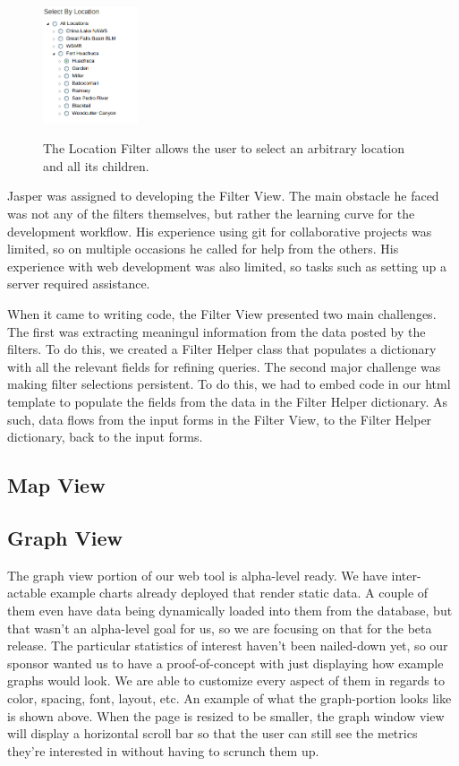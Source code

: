 \documentclass[10pt,peerreview,onecolumn,draftclsnofoot,technote]{IEEEtran}
\begin{document}
\begin{figure}[h]
\centering
\includegraphics[width=0.25\textwidth]{images/location_filter.png}
\label{fig:location_filter}
\captionsetup{justification=centering}
\caption{
  The Location Filter allows the user to select an arbitrary location and all its children.
}
\end{figure}

Jasper was assigned to developing the Filter View.
The main obstacle he faced was not any of the filters themselves, but rather the learning curve for the development workflow.
His experience using git for collaborative projects was limited, so on multiple occasions he called for help from the others.
His experience with web development was also limited, so tasks such as setting up a server required assistance.

When it came to writing code, the Filter View presented two main challenges.
The first was extracting meaningul information from the data posted by the filters.
To do this, we created a Filter Helper class that populates a dictionary with all the relevant fields for refining queries.
The second major challenge was making filter selections persistent.
To do this, we had to embed code in our html template to populate the fields from the data in the Filter Helper dictionary.
As such, data flows from the input forms in the Filter View, to the Filter Helper dictionary, back to the input forms.

\subsection{Map View}

\subsection{Graph View} %
The graph view portion of our web tool is alpha-level ready.
We have inter-actable example charts already deployed that render  static data.
A couple of them even have data being dynamically loaded into them from the database, but that wasn’t an alpha-level goal for us, so we are focusing on that for the beta release.
The particular statistics of interest haven’t been nailed-down yet, so our sponsor wanted us to have a proof-of-concept with just displaying how example graphs would look.
We are able to customize every aspect of them in regards to color, spacing, font, layout, etc.
An example of what the graph-portion looks like is shown above.
When the page is resized to be smaller, the graph window view will display a horizontal scroll bar so that the user can still see the metrics they’re interested in without having to scrunch them up.
\end{document}
